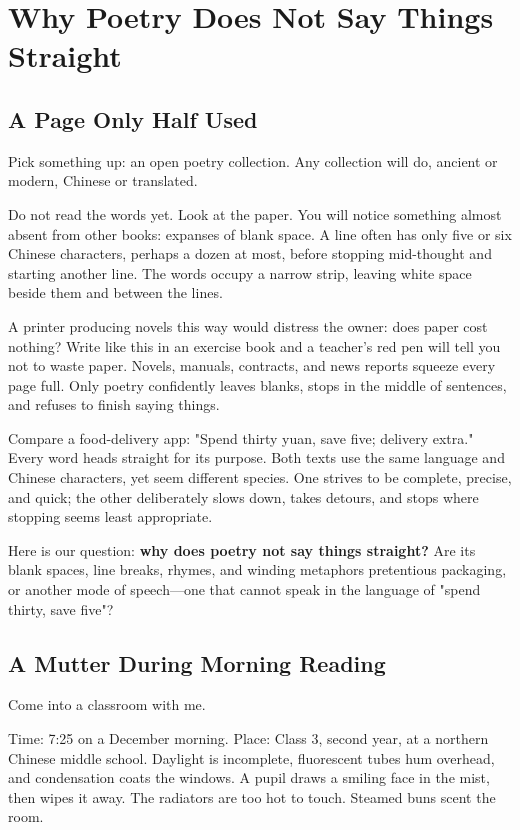 \chapter[Why Poetry Speaks Indirectly]{Why Poetry Does Not Say Things Straight}
\section{A Page Only Half Used}
Pick something up: an open poetry collection. Any collection will do, ancient or modern, Chinese or translated.

Do not read the words yet. Look at the paper. You will notice something almost absent from other books: expanses of blank space. A line often has only five or six Chinese characters, perhaps a dozen at most, before stopping mid-thought and starting another line. The words occupy a narrow strip, leaving white space beside them and between the lines.

A printer producing novels this way would distress the owner: does paper cost nothing? Write like this in an exercise book and a teacher's red pen will tell you not to waste paper. Novels, manuals, contracts, and news reports squeeze every page full. Only poetry confidently leaves blanks, stops in the middle of sentences, and refuses to finish saying things.

Compare a food-delivery app: "Spend thirty yuan, save five; delivery extra." Every word heads straight for its purpose. Both texts use the same language and Chinese characters, yet seem different species. One strives to be complete, precise, and quick; the other deliberately slows down, takes detours, and stops where stopping seems least appropriate.

Here is our question: \textbf{why does poetry not say things straight?} Are its blank spaces, line breaks, rhymes, and winding metaphors pretentious packaging, or another mode of speech---one that cannot speak in the language of "spend thirty, save five"?

\section{A Mutter During Morning Reading}
Come into a classroom with me.

Time: 7:25 on a December morning. Place: Class 3, second year, at a northern Chinese middle school. Daylight is incomplete, fluorescent tubes hum overhead, and condensation coats the windows. A pupil draws a smiling face in the mist, then wipes it away. The radiators are too hot to touch. Steamed buns scent the room.

